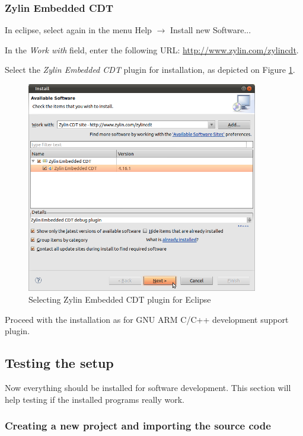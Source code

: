 \documentclass[a4paper, 10pt]{article}
\begin{document}
\subsubsection{Zylin Embedded CDT}

In eclipse, select again in the menu Help $\rightarrow$ Install new Software...

In the \emph{Work with} field, enter the following URL:
\url{http://www.zylin.com/zylincdt}.

Select the \emph{Zylin Embedded CDT} plugin for installation, 
as depicted on Figure \ref{fig:eclipse-zylin}.

    \begin{figure}[H]
    \centering
        \includegraphics[width=0.9\textwidth]{./png-install-guide/eclipse-zylin.png}
        \caption{Selecting Zylin Embedded CDT plugin for Eclipse}
        \label{fig:eclipse-zylin}
    \end{figure}

Proceed with the installation as for GNU ARM C/C++ development support plugin.


\subsection{Testing the setup}

Now everything should be installed for software development. 
This section will help testing if the installed programs really work.

\subsubsection{Creating a new project and importing the source code}
\end{document}
